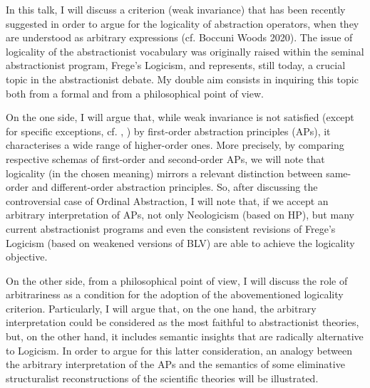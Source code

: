 \documentclass[bsl,meeting]{asl}
\newcommand{\NP}{}
\begin{document}
\thispagestyle{empty}


\NP  
{}

In this talk, I will discuss a criterion (weak invariance) that has been recently suggested in order to argue for the logicality of abstraction operators, when they are understood as arbitrary expressions (cf. Boccuni Woods 2020). The issue of  logicality of the abstractionist vocabulary was originally raised within the seminal abstractionist program, Frege’s Logicism, and represents, still today, a crucial topic in the abstractionist debate. My double aim consists in inquiring this topic both from a formal and from a philosophical point of view. 

On the one side, I will argue that, while weak invariance is not satisfied (except for specific exceptions, cf. \cite{Tarski:1956}, \cite{Woods:2014}) by first-order abstraction principles (APs), it characterises a wide range of higher-order ones. More precisely, by comparing respective schemas of first-order and second-order APs, we will note that logicality (in the chosen meaning) mirrors a relevant distinction between same-order and different-order abstraction principles. 
So, after discussing the controversial case of Ordinal Abstraction, I will note that, if we accept an arbitrary interpretation of APs, not only Neologicism (based on HP), but many current abstractionist programs and even the consistent revisions of Frege’s Logicism (based on weakened versions of BLV) are able to achieve the logicality objective. 
 

On the other side, from a philosophical point of view, I will discuss the role of arbitrariness as a condition for the adoption of the abovementioned logicality criterion. Particularly, I will argue that, on the one hand, the arbitrary interpretation could be considered as the most faithful to abstractionist theories, but, on the other hand, it includes semantic insights that are radically alternative to Logicism. In order to argue for this latter consideration, an analogy between the arbitrary interpretation of the APs and the semantics of some eliminative structuralist reconstructions of the scientific theories will be illustrated.
\end{document}
